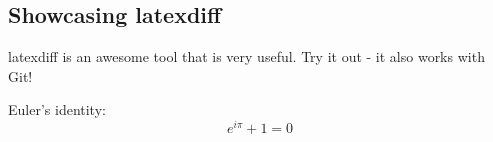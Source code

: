 \documentclass[12pt]{article}
\begin{document}
\begin{flushleft}

\section{Showcasing latexdiff}

latexdiff is an awesome tool that is very useful. Try it out - it also works with Git! \newline

Euler's identity:
\begin{equation}
e^{i \pi} + 1 = 0
\end{equation}



\end{flushleft}
\end{document}

